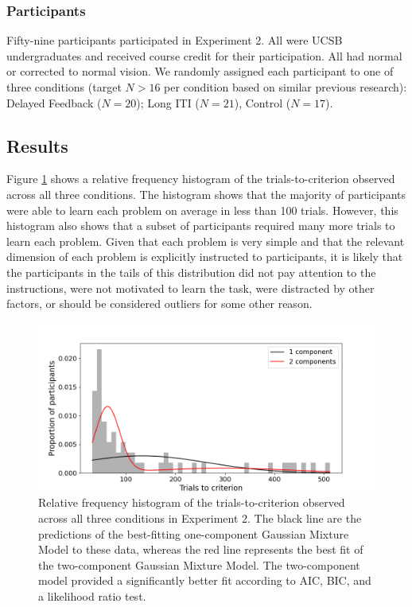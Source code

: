 \documentclass[doc, floatsintext]{apa7}
\begin{document}
\subsubsection{Participants}
Fifty-nine participants participated in Experiment 2. All
were UCSB undergraduates and received course credit for
their participation. All had normal or corrected to normal
vision. We randomly assigned each participant to one of
three conditions (target $N>16$ per condition based on
similar previous research): Delayed Feedback ($N = 20$);
Long ITI ($N = 21$), Control ($ N = 17$).

\subsection{Results}
Figure \ref{fig_gmm_hist_1} shows a relative frequency
histogram of the trials-to-criterion observed across all
three conditions. The histogram shows that the majority of
participants were able to learn each problem on average in
less than 100 trials. However, this histogram also shows
that a subset of participants required many more trials to
learn each problem. Given that each problem is very simple
and that the relevant dimension of each problem is
explicitly instructed to participants, it is likely that the
participants in the tails of this distribution did not pay
attention to the instructions, were not motivated to learn
the task, were distracted by other factors, or should be
considered outliers for some other reason. 

\begin{figure}
  \centering
  \includegraphics[width=.8\textwidth]{../figures/fig_exp_1_gmm.png}
  \caption{
      Relative frequency histogram of the
      trials-to-criterion observed across all three
      conditions in Experiment 2. The black line are the
      predictions of the best-fitting one-component Gaussian
      Mixture Model to these data, whereas the red line
      represents the best fit of the two-component Gaussian
      Mixture Model. The two-component model provided a
      significantly better fit according to AIC, BIC, and a
      likelihood ratio test.
}
  \label{fig_gmm_hist_1}
\end{figure}
\end{document}
